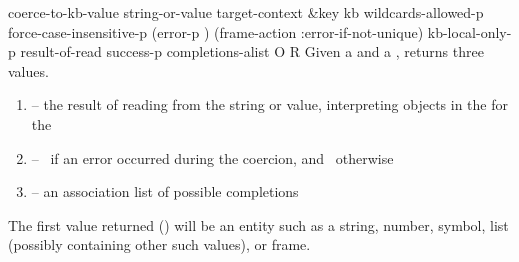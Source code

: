 \begin{okbcop}{coerce-to-kb-value}{ string-or-value target-context \&key kb wildcards-allowed-p force-case-insensitive-p (error-p \true) (frame-action :error-if-not-unique) kb-local-only-p} { result-of-read success-p completions-alist } { O } { R } {  }
   Given a  and a , returns three
   values.
  \begin{enumerate}
  \item {} -- the result of reading from the string or
         value, interpreting objects in the  for the
  \item {} -- \false\ if an error occurred during the
         coercion, and \true\ otherwise
  \item {} -- an association list of possible
         completions
  \end{enumerate}
  The first value returned () will be an entity such
  as a string, number, symbol, list (possibly containing other such values),
  or frame.


\end{okbcop}
